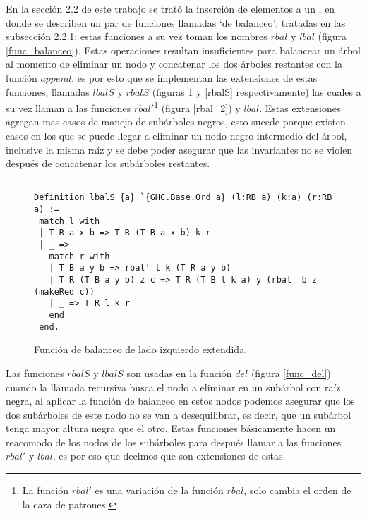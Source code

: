 En la secci\'on 2.2 de este trabajo se trat\'o la inserci\'on de elementos a un {\arn}, en donde se
describen un par de funciones llamadas `de balanceo', tratadas en las subsecci\'on 2.2.1; estas 
funciones a su vez toman los nombres \hyperref[func_balanceo]{$rbal$} y 
\hyperref[func_balanceo]{$lbal$} (figura \ref{func_balanceo}). Estas operaciones resultan 
insuficientes para balancear un \'arbol al momento de eliminar un nodo y concatenar los dos 
\'arboles restantes con la función \hyperref[func_app]{$append$}, es por esto que se implementan las
extensiones de estas funciones, llamadas \hyperref[lbalS]{$lbalS$} y \hyperref[lbalS]{$rbalS$} 
(figuras \ref{lbalS} y \ref{rbalS} respectivamente) las cuales a su vez llaman a las funciones 
\hyperref[rbal_2]{$rbal'$}\footnote{La funci\'on \hyperref[rbal_2]{$rbal'$} es una variación de la 
función \hyperref[func_balanceo]{$rbal$}, solo cambia el orden de la caza de patrones.} (figura
\ref{rbal_2}) y \hyperref[func_balanceo]{$lbal$}. Estas extensiones agregan mas casos de manejo de 
subárboles negros, esto sucede porque existen casos en los que se puede llegar a eliminar un nodo 
negro intermedio del \'arbol, inclusive la misma ra\'iz y se debe poder asegurar que las invariantes 
no se violen después de concatenar los subárboles restantes.

\begin{figure}[!ht]
\centering
\captionsetup{justification=centering}
\begin{verbatim}

Definition lbalS {a} `{GHC.Base.Ord a} (l:RB a) (k:a) (r:RB a) :=
 match l with
 | T R a x b => T R (T B a x b) k r
 | _ =>
   match r with
   | T B a y b => rbal' l k (T R a y b)
   | T R (T B a y b) z c => T R (T B l k a) y (rbal' b z (makeRed c))
   | _ => T R l k r
   end
 end.

\end{verbatim}
\caption{Funci\'on de balanceo de lado izquierdo extendida.}
\label{lbalS}
\end{figure}

Las funciones \hyperref[lbalS]{$rbalS$} y \hyperref[lbalS]{$lbalS$} son usadas en la funci\'on 
\hyperref[func_del]{$del$} (figura \ref{func_del}) cuando la llamada recursiva busca el nodo a 
eliminar en un sub\'arbol con ra\'iz negra, al aplicar la funci\'on de balanceo en estos nodos 
podemos asegurar que los dos subárboles de este nodo no se van a desequilibrar, es decir, que un 
subárbol tenga mayor altura negra que el otro. Estas funciones b\'asicamente hacen un reacomodo de 
los nodos de los sub\'arboles para despu\'es llamar a las funciones \hyperref[rbal_2]{$rbal'$} y 
\hyperref[func_balanceo]{$lbal$}, es por eso que decimos que son extensiones de estas.


